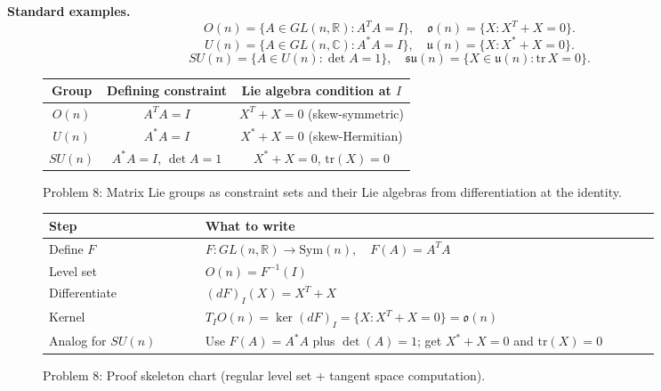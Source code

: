 \begin{solution}
\textbf{Standard examples.}
\[
O(n)=\{A\in GL(n,\mathbb R):A^TA=I\},\quad
\mathfrak o(n)=\{X:X^T+X=0\}.
\]
\[
U(n)=\{A\in GL(n,\mathbb C):A^*A=I\},\quad
\mathfrak u(n)=\{X:X^*+X=0\}.
\]
\[
SU(n)=\{A\in U(n):\det A=1\},\quad
\mathfrak{su}(n)=\{X\in\mathfrak u(n):\mathrm{tr}\,X=0\}.
\]

\begin{figure}[htbp]
	\centering
	\renewcommand{\arraystretch}{1.35}
	\begin{tabular}{|c|c|c|}
		\hline
		\textbf{Group} & \textbf{Defining constraint} & \textbf{Lie algebra condition at $I$} \\
		\hline
		$O(n)$ & $A^TA=I$ & $X^T+X=0$ (skew-symmetric) \\
		\hline
		$U(n)$ & $A^*A=I$ & $X^*+X=0$ (skew-Hermitian) \\
		\hline
		$SU(n)$ & $A^*A=I$, $\det A=1$ & $X^*+X=0$, $\mathrm{tr}(X)=0$ \\
		\hline
	\end{tabular}
	\caption{Problem 8: Matrix Lie groups as constraint sets and their Lie algebras from differentiation at the identity.}
\end{figure}

\begin{figure}[htbp]
	\centering
	\renewcommand{\arraystretch}{1.35}
	\begin{tabular}{|p{0.23\linewidth}|p{0.67\linewidth}|}
		\hline
		\textbf{Step} & \textbf{What to write} \\
		\hline
		Define $F$ & $F:GL(n,\mathbb{R})\to \mathrm{Sym}(n),\quad F(A)=A^TA$ \\
		\hline
		Level set & $O(n)=F^{-1}(I)$ \\
		\hline
		Differentiate & $(dF)_I(X)=X^T+X$ \\
		\hline
		Kernel & $T_IO(n)=\ker(dF)_I=\{X:X^T+X=0\}=\mathfrak{o}(n)$ \\
		\hline
		Analog for $SU(n)$ & Use $F(A)=A^*A$ plus $\det(A)=1$; get $X^*+X=0$ and $\mathrm{tr}(X)=0$ \\
		\hline
	\end{tabular}
	\caption{Problem 8: Proof skeleton chart (regular level set + tangent space computation).}
\end{figure}


\end{solution}
